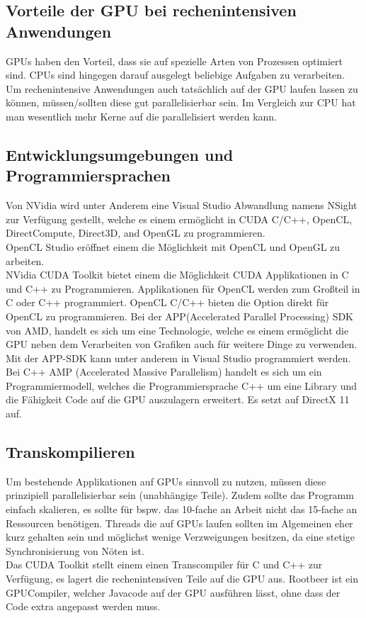 \subsection{Vorteile der GPU bei rechenintensiven Anwendungen}
\label{sec:Vorteile der GPU bei rechenintensiven Anwendungen}
GPUs haben den Vorteil, dass sie auf spezielle Arten von Prozessen optimiert sind. CPUs sind hingegen darauf ausgelegt beliebige Aufgaben zu verarbeiten. Um rechenintensive Anwendungen auch tatsächlich auf der GPU laufen lassen zu können, müssen/sollten diese gut parallelisierbar sein. 
Im Vergleich zur CPU hat man wesentlich mehr Kerne auf die parallelisiert werden kann.

\subsection{Entwicklungsumgebungen und Programmiersprachen}
Von NVidia wird unter Anderem eine Visual Studio Abwandlung namens NSight zur Verfügung gestellt, welche es einem ermöglicht in CUDA C/C++, OpenCL, DirectCompute, Direct3D, and OpenGL zu programmieren.\\
OpenCL Studio eröffnet einem die Möglichkeit mit OpenCL und OpenGL zu arbeiten.\\
NVidia CUDA Toolkit bietet einem die Möglichkeit CUDA Applikationen in C und C++ zu Programmieren.
Applikationen für OpenCL werden zum Großteil in C oder C++ programmiert. OpenCL C/C++ bieten die Option direkt für OpenCL zu programmieren.
Bei der APP(Accelerated Parallel Processing) SDK von AMD, handelt es sich um eine Technologie, welche es einem ermöglicht die GPU neben dem Verarbeiten von Grafiken auch für weitere Dinge zu verwenden. Mit der APP-SDK kann unter anderem in Visual Studio programmiert werden. \cite{appsdk}\\
Bei C++ AMP (Accelerated Massive Parallelism) handelt es sich um ein Programmiermodell, welches die Programmiersprache C++  um eine Library und die Fähigkeit Code auf die GPU auszulagern erweitert.
Es setzt auf DirectX 11 auf. \cite{AMP}
\subsection{Transkompilieren}
Um bestehende Applikationen auf GPUs sinnvoll zu nutzen, müssen diese prinzipiell parallelisierbar sein (unabhängige Teile). Zudem sollte das Programm einfach skalieren, es sollte für bspw. das 10-fache an Arbeit nicht das 15-fache an Ressourcen benötigen.
Threads die auf GPUs laufen sollten im Algemeinen eher kurz gehalten sein und möglichst wenige Verzweigungen besitzen, da eine stetige Synchronisierung von Nöten ist. \cite{GPUGrundlagen}\\
Das CUDA Toolkit stellt einem einen Transcompiler für C und C++ zur Verfügung, es lagert die rechenintensiven Teile auf die GPU aus.
Rootbeer ist ein GPUCompiler, welcher Javacode auf der GPU ausführen lässt, ohne dass der Code extra angepasst werden muss.\cite{Rootbeer}

